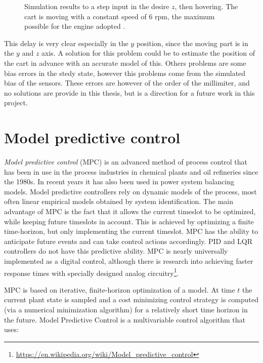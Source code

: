 \begin{figure}[h]
	\centering
 	
 	\caption{Simulation results to a step input in the desire $z$, then hovering. The cart is moving with a constant speed of $6$ rpm, the maximum possible for the engine adopted \cite{Carlos}.}
 	\label{fig:simulation2}		
\end{figure}

\noindent This delay is very clear especially in the $y$ position, since the moving part is in the $y$ and $z$ axis. A solution for this problem could be to estimate the position of the cart in advance with an accurate model of this. Others problems are some bias errors in the stedy state, however this problems come from the simulated bias of the sensors. These errors are however of the order of the millimiter, and no solutions are provide in this thesis, but is a direction for a future work in this project.


\section{Model predictive control}

\textit{Model predictive control} (MPC) is an advanced method of process control that has been in use in the process industries in chemical plants and oil refineries since the 1980s. In recent years it has also been used in power system balancing models. Model predictive controllers rely on dynamic models of the process, most often linear empirical models obtained by system identification. The main advantage of MPC is the fact that it allows the current timeslot to be optimized, while keeping future timeslots in account. This is achieved by optimizing a finite time-horizon, but only implementing the current timeslot. MPC has the ability to anticipate future events and can take control actions accordingly. PID and LQR controllers do not have this predictive ability. MPC is nearly universally implemented as a digital control, although there is research into achieving faster response times with specially designed analog circuitry\footnote{\url{https://en.wikipedia.org/wiki/Model_predictive_control}}.

\noindent MPC is based on iterative, finite-horizon optimization of a model. At time $t$ the current plant state is sampled and a cost minimizing control strategy is computed (via a numerical minimization algorithm) for a relatively short time horizon in the future. Model Predictive Control is a multivariable control algorithm that uses:

